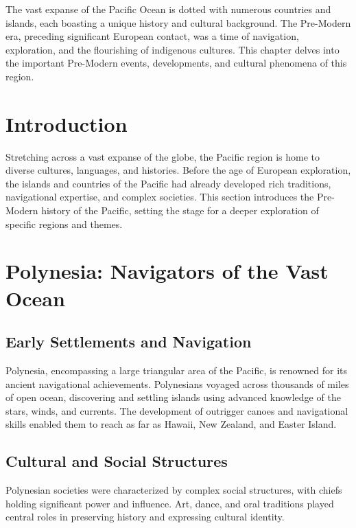\documentclass[a4paper,12pt]{book}
\begin{document}
The vast expanse of the Pacific Ocean is dotted with numerous countries and islands, each boasting a unique history and cultural background. The Pre-Modern era, preceding significant European contact, was a time of navigation, exploration, and the flourishing of indigenous cultures. This chapter delves into the important Pre-Modern events, developments, and cultural phenomena of this region.

\section{Introduction}
\label{sec:introduction-pre-modern-pacific}

Stretching across a vast expanse of the globe, the Pacific region is home to diverse cultures, languages, and histories. Before the age of European exploration, the islands and countries of the Pacific had already developed rich traditions, navigational expertise, and complex societies. This section introduces the Pre-Modern history of the Pacific, setting the stage for a deeper exploration of specific regions and themes.

\section{Polynesia: Navigators of the Vast Ocean}
\label{sec:polynesia}

\subsection{Early Settlements and Navigation}
\label{subsec:polynesia-settlements-navigation}

Polynesia, encompassing a large triangular area of the Pacific, is renowned for its ancient navigational achievements. Polynesians voyaged across thousands of miles of open ocean, discovering and settling islands using advanced knowledge of the stars, winds, and currents. The development of outrigger canoes and navigational skills enabled them to reach as far as Hawaii, New Zealand, and Easter Island.

\subsection{Cultural and Social Structures}
\label{subsec:polynesia-culture-society}

Polynesian societies were characterized by complex social structures, with chiefs holding significant power and influence. Art, dance, and oral traditions played central roles in preserving history and expressing cultural identity.
\end{document}
